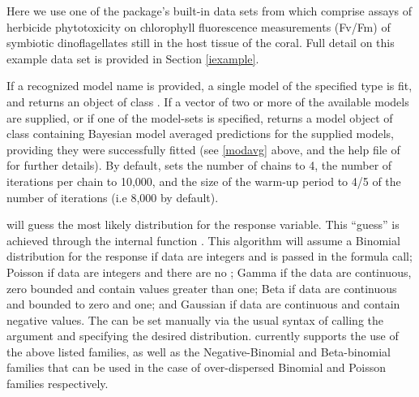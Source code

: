\documentclass[
  shortnames]{jss}
\begin{document}
Here we use one of the package's built-in data sets from \citet{jones2003meps} which comprise assays of herbicide phytotoxicity on chlorophyll fluorescence measurements (Fv/Fm) of symbiotic dinoflagellates still in the host tissue of the coral. Full detail on this example data set is provided in Section \ref{iexample}.

\begin{CodeChunk}
\end{CodeChunk}

If a recognized model name is provided, a single model of the specified type is fit, and  returns an object of class . If a vector of two or more of the available models are supplied, or if one of the model-sets is specified,  returns a model object of class  containing Bayesian model averaged predictions for the supplied models, providing they were successfully fitted (see \ref{modavg} above, and the help file of  for further details). By default,  sets the number of chains to 4, the number of iterations per chain to 10,000, and the size of the warm-up period to 4/5 of the number of iterations (i.e 8,000 by default).

 will guess the most likely distribution for the response variable. This ``guess'' is achieved through the internal function . This algorithm will assume a Binomial distribution for the response if data are integers and  is passed in the formula call; Poisson if data are integers and there are no ; Gamma if the data are continuous, zero bounded and contain values greater than one; Beta if data are continuous and bounded to zero and one; and Gaussian if data are continuous and contain negative values. The  can be set manually via the usual  syntax of calling the argument  and specifying the desired distribution.  currently supports the use of the above listed families, as well as the Negative-Binomial and Beta-binomial families that can be used in the case of over-dispersed Binomial and Poisson families respectively.
\end{document}
